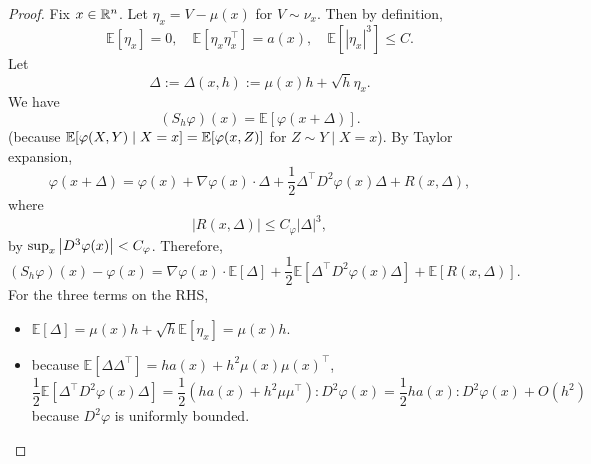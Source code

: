 \begin{proof}
    Fix $x \in \mathbb{R}^n$. Let $\eta_x = V - \mu(x)$ for $V \sim \nu_x$. Then by definition,
    \begin{equation*}
        \mathbb{E}\left[\eta_x\right]=0, \quad \mathbb{E}\left[\eta_x \eta_x^{\top}\right]=a(x), \quad \mathbb{E}\left[\left|\eta_x\right|^3\right] \leq C .
    \end{equation*}
    Let
    \begin{equation*}
        \Delta:=\Delta(x, h):=\mu(x) h+\sqrt{h} \eta_x .
    \end{equation*}
    We have
    \begin{equation*}
        \left(S_h \varphi\right)(x)=\mathbb{E}[\varphi(x+\Delta)] .
    \end{equation*}
    (because $\mathbb{E}[\varphi(X,Y) \mid X = x] = \mathbb{E}[\varphi(x,Z)]$ for $Z \sim Y \mid X=x$). By Taylor expansion,
    \begin{equation*}
        \varphi(x+\Delta)=\varphi(x)+\nabla \varphi(x) \cdot \Delta+\frac{1}{2} \Delta^{\top} D^2 \varphi(x) \Delta+R(x, \Delta),
    \end{equation*}
    where
    \begin{equation*}
        |R(x, \Delta)| \leq C_{\varphi}|\Delta|^3,
    \end{equation*}
    by $\sup_x \left\lvert D^3\varphi(x)\right\lvert < C_{\varphi}$. Therefore,
    \begin{equation*}
        \left(S_h \varphi\right)(x)-\varphi(x)=\nabla \varphi(x) \cdot \mathbb{E}[\Delta]+\frac{1}{2} \mathbb{E}\left[\Delta^{\top} D^2 \varphi(x) \Delta\right]+\mathbb{E}[R(x, \Delta)].
    \end{equation*}
    For the three terms on the RHS,
    \begin{itemize}
        \item $\mathbb{E}[\Delta]=\mu(x) h+\sqrt{h} \mathbb{E}\left[\eta_x\right]=\mu(x) h $.
        \item because $\mathbb{E}\left[\Delta \Delta^{\top}\right]= h a(x)+h^2 \mu(x) \mu(x)^{\top}$,
        \begin{equation*}
            \frac{1}{2} \mathbb{E}\left[\Delta^{\top} D^2 \varphi(x) \Delta\right]=\frac{1}{2}\left(h a(x)+h^2 \mu \mu^{\top}\right): D^2 \varphi(x)=\frac{1}{2} h a(x): D^2 \varphi(x)+O\left(h^2\right)
        \end{equation*}
        because $D^2\varphi$ is uniformly bounded.


\end{itemize}
\end{proof}
